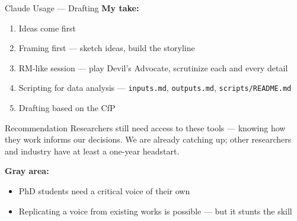 \documentclass[xcolor,aspectratio=169,compress]{beamer}
\begin{document}
\begin{frame}{Claude Usage --- Drafting}
  \small
  \textbf{My take:}
  \begin{enumerate}\setlength{\itemsep}{2pt}\small
    \item Ideas come first
    \item Framing first --- sketch ideas, build the storyline
    \item RM-like session --- play Devil's Advocate, scrutinize each and every detail
    \item Scripting for data analysis --- {\footnotesize\texttt{inputs.md}, \texttt{outputs.md}, \texttt{scripts/README.md}}
    \item Drafting based on the CfP
  \end{enumerate}
  \medskip
  \begin{alertblock}{\footnotesize Recommendation}
    \footnotesize Researchers still need access to these tools --- knowing how they work
    informs our decisions. We are already catching up; other researchers and industry have at least
    a one-year headstart.
  \end{alertblock}
  \medskip
  \textbf{Gray area:}
  \begin{itemize}\setlength{\itemsep}{2pt}\small
    \item PhD students need a critical voice of their own
    \item Replicating a voice from existing works is possible --- but it stunts the skill
  \end{itemize}
\end{frame}
\end{document}
